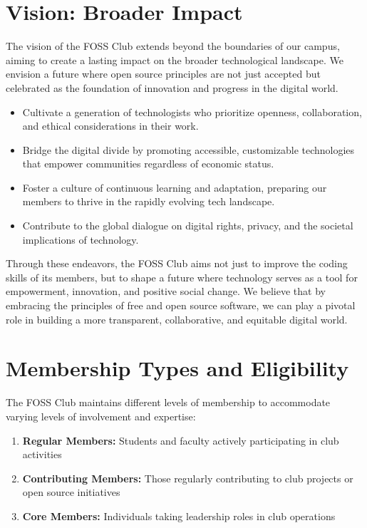 \documentclass[12pt,a4paper]{article}
\begin{document}
\section{Vision: Broader Impact}

The vision of the FOSS Club extends beyond the boundaries of our campus, aiming to create a lasting impact on the broader technological landscape. We envision a future where open source principles are not just accepted but celebrated as the foundation of innovation and progress in the digital world.

\begin{itemize}
    \item Cultivate a generation of technologists who prioritize openness, collaboration, and ethical considerations in their work.
    \item Bridge the digital divide by promoting accessible, customizable technologies that empower communities regardless of economic status.
    \item Foster a culture of continuous learning and adaptation, preparing our members to thrive in the rapidly evolving tech landscape.
    \item Contribute to the global dialogue on digital rights, privacy, and the societal implications of technology.
\end{itemize}

Through these endeavors, the FOSS Club aims not just to improve the coding skills of its members, but to shape a future where technology serves as a tool for empowerment, innovation, and positive social change. We believe that by embracing the principles of free and open source software, we can play a pivotal role in building a more transparent, collaborative, and equitable digital world.

\section{Membership Types and Eligibility}

The FOSS Club maintains different levels of membership to accommodate varying levels of involvement and expertise:

\begin{enumerate}
    \item \textbf{Regular Members:} Students and faculty actively participating in club activities
    \item \textbf{Contributing Members:} Those regularly contributing to club projects or open source initiatives
    \item \textbf{Core Members:} Individuals taking leadership roles in club operations
    \end{enumerate}
\end{document}
